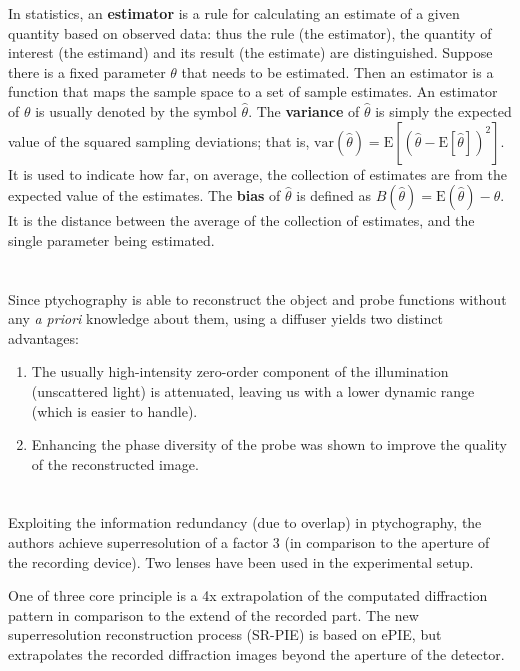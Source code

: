 \documentclass{article}
\begin{document}
In statistics, an \textbf{estimator} is a rule for calculating an estimate of a given quantity based on observed data: thus the rule (the estimator), the quantity of interest (the estimand) and its result (the estimate) are distinguished. Suppose there is a fixed parameter $\theta$  that needs to be estimated. Then an estimator is a function that maps the sample space to a set of sample estimates. An estimator of $\theta$  is usually denoted by the symbol $\hat{\theta}$.
The \textbf{variance} of $\hat{\theta}$ is simply the expected value of the squared sampling deviations; that is, $\mathrm{var}(\hat{\theta}) =\mathrm{E} [(\hat{\theta}-\mathrm{E} [\hat{\theta}])^{2}]$. It is used to indicate how far, on average, the collection of estimates are from the expected value of the estimates.
The \textbf{bias} of $\hat{\theta}$ is defined as $B(\hat{\theta })=\mathrm{E}(\hat{\theta})-\theta$. It is the distance between the average of the collection of estimates, and the single parameter being estimated. 


\section{\cite{Maiden2013-zp} }

Since ptychography is able to reconstruct the object and probe functions without any \textit{a priori} knowledge about them, using a diffuser yields two distinct advantages:

\begin{enumerate}
    \item The usually high-intensity zero-order component of the illumination (unscattered light) is attenuated, leaving us with a lower dynamic range (which is easier to handle).
    \item Enhancing the phase diversity of the probe was shown to improve the quality of the reconstructed image.
\end{enumerate}

\section{\cite{Maiden2011-up} }

Exploiting the information redundancy (due to overlap) in ptychography, the authors achieve superresolution of a factor 3 (in comparison to the aperture of the recording device).
Two lenses have been used in the experimental setup.


One of three core principle is a 4x extrapolation of the computated diffraction pattern in comparison to the extend of the recorded part.
The new superresolution reconstruction process (SR-PIE) is based on ePIE, but extrapolates the recorded diffraction images beyond the aperture of the detector.
\end{document}
